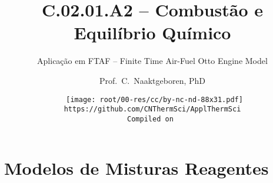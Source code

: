 \makeatletter
\immediate{} %
\makeatother



\title{C.02.01.A2 -- Combustão e Equilíbrio Químico}
\subtitle{Aplicação em FTAF -- Finite Time Air-Fuel Otto Engine Model}
\author{Prof.~C.~Naaktgeboren, PhD}
\date{{\scriptsize\tt%
    \texttt{[image: root/00-res/cc/by-nc-nd-88x31.pdf]}\\[\smallskipamount]
    https://github.com/CNThermSci/ApplThermSci\\
    Compiled on 
}}

\frame{\titlepage}

\section{Modelos de Misturas Reagentes}

